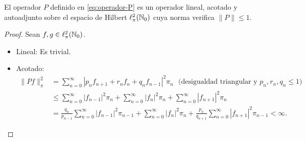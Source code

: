     \begin{lema}
        El operador $P$ definido en \eqref{eq:operador-P} es un operador lineal, acotado y autoadjunto sobre el espacio de Hilbert $\ell^2_\pi(\mathbb{N}_0)$ cuya norma verifica $\|P\|\leq 1$.
    \end{lema}
    \begin{proof} Sean $f,g\in\ell^2_\pi(\mathbb{N}_0)$.
        \begin{itemize}
            \item Lineal: Es trivial.
            \item Acotado:
            \begin{equation*}
                \begin{split}
                    \|Pf\|_\pi^2 &= \sum_{n=0}^\infty |p_n f_{n+1} + r_n f_n + q_n f_{n-1}|^2 \pi_n \ \ \ \text{(desigualdad triangular y }p_n,r_n,q_n\leq 1\text{)} \\
                    &\leq \sum_{n=0}^\infty |f_{n-1}|^2\pi_n + \sum_{n=0}^\infty |f_{n}|^2\pi_n + \sum_{n=0}^\infty |f_{n+1}|^2\pi_n \\
                    &= \frac{q_n}{p_{n-1}} \sum_{n=0}^\infty |f_{n-1}|^2\pi_{n-1} + \sum_{n=0}^\infty |f_{n}|^2\pi_n + \frac{p_n}{q_{n+1}}  \sum_{n=0}^\infty |f_{n+1}|^2\pi_{n-1} < \infty.
                \end{split}
            \end{equation*}


\end{itemize}
\end{proof}

